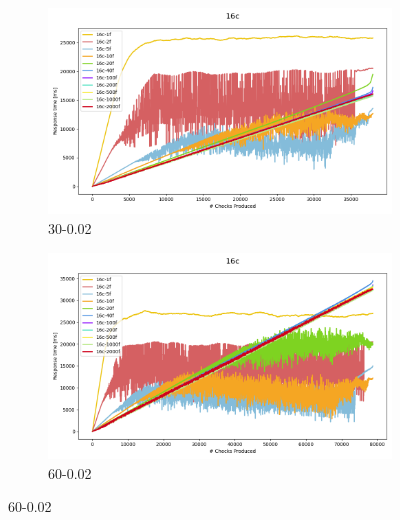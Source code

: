 \documentclass[12pt,a4paper]{article}
\begin{document}
\begin{figure}[H]
    \centering
    \begin{subfigure}[b]{\textwidth}
        \centering
        \includegraphics[scale=0.5]{../processed/NRT/small/checks/30-0.02/fixedcores/16c/plots/traces-response-time-reduced.png}
        \caption{30-0.02}
    \end{subfigure}
    
    \vspace{0.5cm} %
    \begin{subfigure}[b]{\textwidth}
        \centering
        \includegraphics[scale=0.5]{../processed/NRT/small/checks/60-0.02/fixedcores/16c/plots/traces-response-time-reduced.png}
        \caption{60-0.02}
    \end{subfigure}
    

\end{figure}
\end{document}
